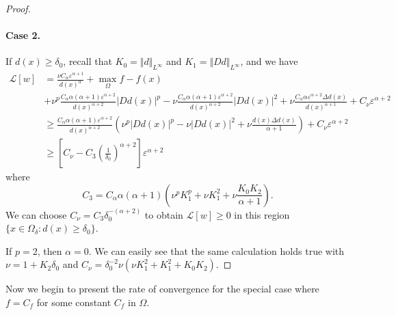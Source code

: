 \documentclass[12pt,reqno]{amsart}
\numberwithin{figure}{section}
\theoremstyle{plain}
\newtheorem{thm}{Theorem}[section]
\theoremstyle{remark}
\numberwithin{equation}{section}
\newcommand{\R}{\mathbb{R}}
\begin{document}
\begin{proof}
\paragraph{\textbf{Case 2.}} If $d(x)\geq \delta_0$, recall that $K_0 = \Vert d\Vert_{L^\infty}$ and $K_1 = \Vert D d\Vert_{L^\infty}$, and we have
\begin{align*}
    \mathcal{L}[w] &= \frac{\nu C_\alpha \varepsilon^{\alpha+1}}{d(x)^\alpha} + \max_{\Omega} f - f(x)\\
    &+  \nu^p\frac{C_\alpha\alpha(\alpha+1)\varepsilon^{\alpha+2}}{d(x)^{\alpha+2}}|D d(x)|^p - \nu \frac{C_\alpha \alpha(\alpha+1)\varepsilon^{\alpha+2}}{d(x)^{\alpha+2}}|D d(x)|^2 
    + \nu \frac{C_\alpha \alpha \varepsilon^{\alpha+2}\Delta d(x)}{d(x)^{\alpha+1}} + C_\nu \varepsilon^{\alpha+2}\\
    &\geq \frac{C_\alpha \alpha(\alpha+1)\varepsilon^{\alpha+2}}{d(x)^{\alpha+2}}\left(\nu^p|D d(x)|^p - \nu |D d(x)|^2 + \nu \frac{d(x) \Delta d(x)}{\alpha+1}\right) + C_\nu \varepsilon^{\alpha+2}\\
    &\geq \left[C_\nu - C_3\left(\frac{1}{\delta_0}\right)^{\alpha+2}\right]\varepsilon^{\alpha+2}
\end{align*}
where 
\begin{equation*}
    C_3 = C_\alpha\alpha(\alpha+1) \left(\nu^pK_1^p + \nu K_1^2 + \nu \frac{K_0K_2}{\alpha+1}\right).
\end{equation*}
We can choose $C_\nu = C_3\delta_0^{-(\alpha+2)}$ to obtain $\mathcal{L}[w]\geq 0$ in this region $\{x\in \Omega_\delta:d(x)\geq \delta_0\}$. 
\smallskip

\noindent
If $p=2$, then $\alpha = 0$. We can easily see that the same calculation holds true with $\nu = 1+K_2\delta_0$ and $C_\nu = \delta_0^{-2}\nu (\nu K_1^2 + K_1^2+ K_0K_2)$.
\end{proof}

Now we begin to present the rate of convergence for the special case where $f = C_f$ for some constant $C_f$ in $\Omega$.
\end{document}
